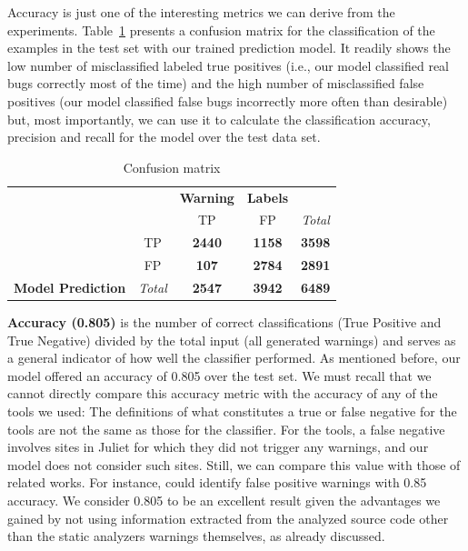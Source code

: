 Accuracy is just one of the interesting metrics we can derive from the experiments.
Table~\ref{tab:matrix} presents a confusion matrix for the classification of
the examples in the test set with our trained prediction model. It readily
shows the low number of misclassified labeled true positives (i.e., our model
classified real bugs correctly most of the time) and the high number of
misclassified false positives (our model classified false bugs incorrectly
more often than desirable) but, most importantly,
we can use it to calculate the classification accuracy, precision and recall for the
model over the test data set.


\begin{table}
  \begin{center}
\begin{tabular}{|c|c|c|c|c|}
\hline
                                            &                                        & \textbf{Warning}                      & \textbf{Labels}                       &                                        \\ 
                                            &                                        & TP                                    & FP                                    & \textit{Total} \\ 
                                            & TP                                     & \textbf{2440}                         & \textbf{1158}                         & \textbf{3598}  \\ 
                                            & FP                                     & \textbf{107}                          & \textbf{2784}                         & \textbf{2891}  \\ 
\multirow{-5}{*}{\textbf{Model Prediction}} & \textit{Total} & \textbf{2547} & \textbf{3942} & \textbf{6489}  \\ \hline
\end{tabular}
\caption{Confusion matrix}\label{tab:matrix}
\end{center}
\end{table}


\textbf{Accuracy (0.805)} is the number of correct classifications
    (True Positive and True Negative) divided by the total input (all
    generated warnings) and serves as a general indicator of how well
    the classifier performed. As mentioned before, our model offered an
    accuracy of 0.805 over the test set. We must recall that we cannot
    directly compare
    this accuracy metric with the accuracy of any of the tools we used:
    The definitions of what constitutes a true or false
    negative for the tools are not the same as those for the classifier.
    For the tools, a false negative involves
    sites in Juliet for which they did not trigger any warnings,
    and our model does not consider such sites. Still, we can
    compare this value with those of related works. For instance, \cite{ruthruff_predicting_2008} could
    identify false positive warnings with 0.85 accuracy. We consider 0.805 to
    be an excellent result given the advantages we gained by not using information extracted from
    the analyzed source code other than the static analyzers warnings
    themselves, as already discussed.

